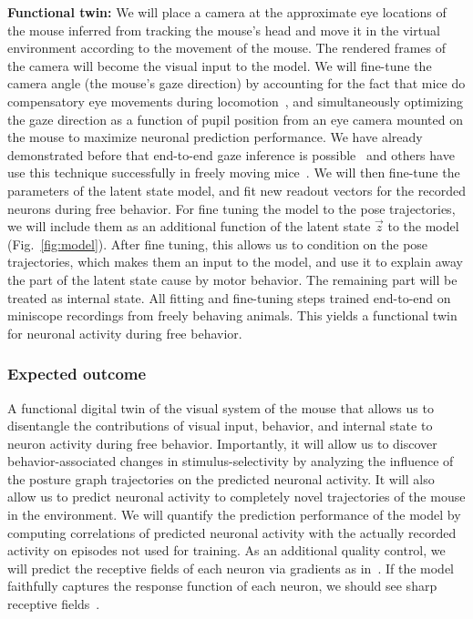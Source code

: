 \documentclass[B2,COG]{ercgrant}
\begin{document}
\textbf{Functional twin:} We will place a camera at the approximate eye locations of the mouse inferred from tracking the mouse's head and move it in the virtual environment according to the movement of the mouse. 
The rendered frames of the camera will become the visual input to the model.
We will fine-tune the camera angle (the mouse's gaze direction) by accounting for the fact that mice do compensatory eye movements during locomotion~\parencite[similar to rats][]{Wallace2013-lf}, and simultaneously optimizing the gaze direction as a function of pupil position from an eye camera 
mounted on the mouse to maximize neuronal prediction performance. 
We have already demonstrated before that end-to-end gaze inference is possible~\parencite{Sinz2018-sk,Walker2019-yw} and others have use this technique successfully in freely moving mice~\parencite{Parker2022-ac}.
We will then fine-tune the parameters of the latent state model, and fit new readout vectors for the recorded neurons during free behavior.
For fine tuning the model to the pose trajectories, we will include them as an additional function of the latent state $\vec{z}$ to the model (Fig.~\ref{fig:model}). 
After fine tuning, this allows us to condition on the pose trajectories, which makes them an input to the model, and use it to explain away the part of the latent state cause by motor behavior.
The remaining part will be treated as internal state. 
All fitting and fine-tuning steps trained end-to-end  on  miniscope recordings from freely behaving animals. 
This yields a functional twin for neuronal activity during free behavior.

\subsubsection{Expected outcome} 

A functional digital twin of the visual system of the mouse that allows us to disentangle the contributions of visual input, behavior, and internal state to neuron activity during free behavior. 
Importantly, it will allow us to discover behavior-associated changes in stimulus-selectivity by analyzing the influence of the posture graph trajectories on the predicted neuronal activity.
It will also allow us to predict neuronal activity to completely novel trajectories of the mouse in the environment.
We will quantify the prediction performance of the model by computing correlations of predicted neuronal activity with the actually recorded activity on episodes not used for training. 
As an additional quality control, we will predict the receptive fields of each neuron via gradients as in~\textcite{Sinz2018-sk}. 
If the model faithfully captures the response function of each neuron, we should see sharp receptive fields~\parencite{Parker2022-ac}.
\end{document}
